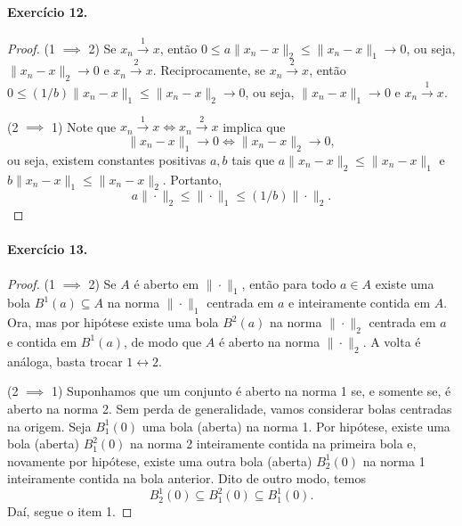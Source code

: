 \documentclass[12pt,a4paper]{article}
\begin{document}
\paragraph{Exercício 12.}
\begin{proof}
(1 $\implies$ 2) Se $x_n \xrightarrow{1} x$, então $0 \leq a\|x_n - x\|_2 \leq \|x_n - x\|_1 \to 0$, ou seja, $\|x_n - x\|_2 \to 0$ 
e $x_n \xrightarrow{2} x$. Reciprocamente, se $x_n \xrightarrow{2} x$, então $0 \leq (1/b)\|x_n - x\|_1 \leq \|x_n - x\|_2 \to 0$, 
ou seja, $\|x_n - x\|_1 \to 0$ e $x_n \xrightarrow{1} x$.

(2 $\implies$ 1) Note que $x_n \xrightarrow{1} x \iff x_n \xrightarrow{2} x$ implica que
\begin{equation*}
    \|x_n - x\|_1 \to 0 \iff \|x_n - x\|_2 \to 0,
\end{equation*}
ou seja, existem constantes positivas $a,b$ tais que $a\|x_n - x\|_2 \leq \|x_n - x\|_1$ e $b\|x_n - x\|_1 \leq \|x_n - x\|_2$. 
Portanto,
\begin{equation*}
    a\|\cdot \|_2 \leq \|\cdot \|_1 \leq (1/b)\|\cdot \|_2.
\end{equation*}
\end{proof}

\paragraph{Exercício 13.}
\begin{proof}
(1 $\implies$ 2) Se $A$ é aberto em $\|\cdot \|_1$, então para todo $a\in A$ existe uma bola $B^1(a)\subseteq A$ na norma 
$\|\cdot\|_1$ centrada em $a$ e inteiramente contida em $A$. Ora, mas por hipótese existe uma bola $B^2(a)$ 
na norma $\|\cdot\|_2$ centrada em $a$ e contida em $B^1(a)$, de modo que $A$ é aberto na norma $\|\cdot\|_2$. 
A volta é análoga, basta trocar $1 \leftrightarrow 2$.

(2 $\implies$ 1) Suponhamos que um conjunto é aberto na norma 1 se, e somente se, é aberto na norma 2. Sem perda de
generalidade, vamos considerar bolas centradas na origem. Seja $B_1^1(0)$ uma bola (aberta) na norma 1. Por hipótese,
existe uma bola (aberta) $B_1^2(0)$ na norma 2 inteiramente contida na primeira bola e, novamente por hipótese, existe
uma outra bola (aberta) $B_2^1(0)$ na norma 1 inteiramente contida na bola anterior. Dito de outro modo, temos
\begin{equation*}
    B_2^1(0) \subseteq B_1^2(0) \subseteq B_1^1(0).
\end{equation*}
Daí, segue o item 1.
\end{proof}
\end{document}
